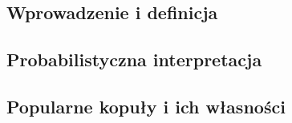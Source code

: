 \subsection{Wprowadzenie i definicja}

\label{subsec:dwuwymiarowe_kopuly_definicja}

\subsection{Probabilistyczna interpretacja}

\label{subsec:dwuwymiarowe_kopuly_probal}

\subsection{Popularne kopuły i ich własności}

\label{subsec:dwuwymiarowe_kopuly_przyklady}

